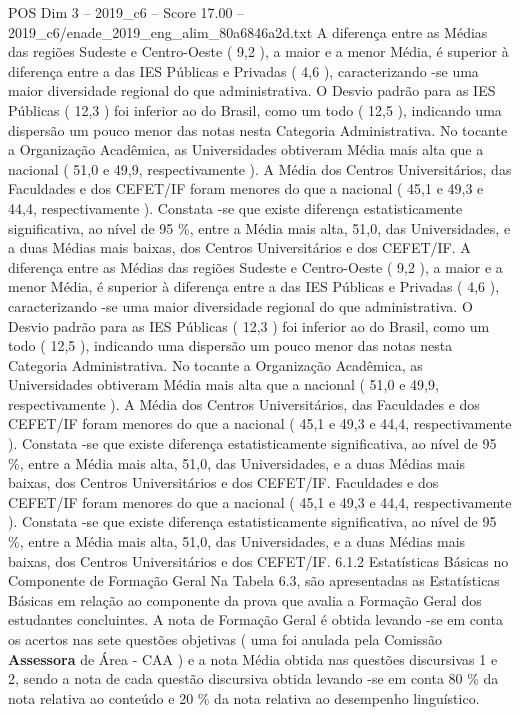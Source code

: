 \begin{textsample}{POS Dim 3 – 2019\_c6 – Score 17.00 – 2019\_c6/enade\_2019\_eng\_alim\_80a6846a2d.txt}
A diferença entre as Médias das regiões Sudeste e Centro-Oeste ( 9,2 ), a maior e a menor Média, é superior à diferença entre a das IES Públicas e Privadas ( 4,6 ), caracterizando -se uma maior diversidade regional do que administrativa.
O Desvio padrão para as IES Públicas ( 12,3 ) foi inferior ao do Brasil, como um todo ( 12,5 ), indicando uma dispersão um pouco menor das notas nesta Categoria Administrativa.
No tocante a Organização Acadêmica, as Universidades obtiveram Média mais alta que a nacional ( 51,0 e 49,9, respectivamente ).
A Média dos Centros Universitários, das Faculdades e dos CEFET/IF foram menores do que a nacional ( 45,1 e 49,3 e 44,4, respectivamente ).
Constata -se que existe diferença estatisticamente significativa, ao nível de 95 \%, entre a Média mais alta, 51,0, das Universidades, e a duas Médias mais baixas, dos Centros Universitários e dos CEFET/IF.
A diferença entre as Médias das regiões Sudeste e Centro-Oeste ( 9,2 ), a maior e a menor Média, é superior à diferença entre a das IES Públicas e Privadas ( 4,6 ), caracterizando -se uma maior diversidade regional do que administrativa.
O Desvio padrão para as IES Públicas ( 12,3 ) foi inferior ao do Brasil, como um todo ( 12,5 ), indicando uma dispersão um pouco menor das notas nesta Categoria Administrativa.
No tocante a Organização Acadêmica, as Universidades obtiveram Média mais alta que a nacional ( 51,0 e 49,9, respectivamente ).
A Média dos Centros Universitários, das Faculdades e dos CEFET/IF foram menores do que a nacional ( 45,1 e 49,3 e 44,4, respectivamente ).
Constata -se que existe diferença estatisticamente significativa, ao nível de 95 \%, entre a Média mais alta, 51,0, das Universidades, e a duas Médias mais baixas, dos Centros Universitários e dos CEFET/IF.
Faculdades e dos CEFET/IF foram menores do que a nacional ( 45,1 e 49,3 e 44,4, respectivamente ).
Constata -se que existe diferença estatisticamente significativa, ao nível de 95 \%, entre a Média mais alta, 51,0, das Universidades, e a duas Médias mais baixas, dos Centros Universitários e dos CEFET/IF. 6.1.2 Estatísticas Básicas no Componente de Formação Geral Na Tabela 6.3, são apresentadas as Estatísticas Básicas em relação ao componente da prova que avalia a Formação Geral dos estudantes concluintes.
A nota de Formação Geral é obtida levando -se em conta os acertos nas sete questões objetivas ( uma foi anulada pela Comissão \textbf{Assessora} de Área - CAA ) e a nota Média obtida nas questões discursivas 1 e 2, sendo a nota de cada questão discursiva obtida levando -se em conta 80 \% da nota relativa ao conteúdo e 20 \% da nota relativa ao desempenho linguístico.

\end{textsample}
